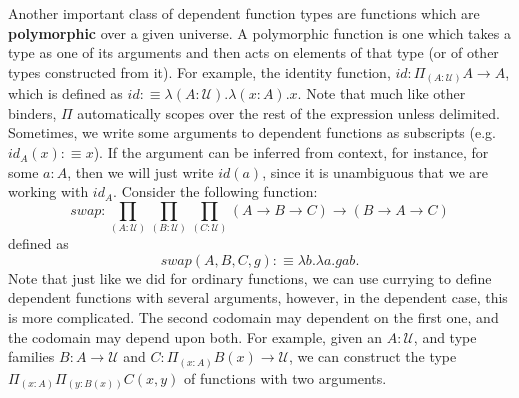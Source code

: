 \documentclass[letterpaper, 10 pt, conference]{ieeeconf}  %
\begin{document}
Another important class of dependent function types are functions which are \textbf{polymorphic} over a given universe. A polymorphic function is one which takes a type as one of its arguments and then acts on elements of that type (or of other types constructed from it). For example, the identity function, $id : \Pi_{(A:\mathcal{U})} A \rightarrow A$, which is defined as $id :\equiv \lambda(A:\mathcal{U}).\lambda(x:A). x$. Note that much like other binders, $\Pi$ automatically scopes over the rest of the expression unless delimited. Sometimes, we write some arguments to dependent functions as subscripts (e.g. $id_A(x) :\equiv x$). If the argument can be inferred from context, for instance, for some $a : A$, then we will just write $id(a)$, since it is unambiguous that we are working with $id_A$. Consider the following function:
\begin{equation}
    swap : \prod_{(A:\mathcal{U})}  \prod_{(B:\mathcal{U})} \prod_{(C:\mathcal{U})} (A \rightarrow B \rightarrow C) \rightarrow (B \rightarrow A \rightarrow C)
\end{equation}
defined as
\begin{equation}
    swap(A, B, C, g) :\equiv \lambda b. \lambda a. g a b.
\end{equation}
Note that just like we did for ordinary functions, we can use currying to define dependent functions with several arguments, however, in the dependent case, this is more complicated. The second codomain may dependent on the first one, and the codomain may depend upon both. For example, given an $A : \mathcal{U}$, and type families $B: A \rightarrow \mathcal{U}$ and $C : \Pi_{(x:A)} B(x) \rightarrow \mathcal{U}$, we can construct the type $\Pi_{(x:A)}\Pi_{(y:B(x))} C(x,y)$ of functions with two arguments.
\end{document}
